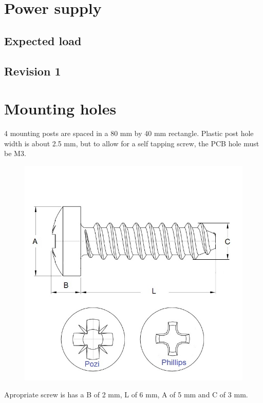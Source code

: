\documentclass[11pt]{article}
\begin{document}
\section{Power supply}

\subsection{Expected load}
\subsection{Revision 1}



\section{Mounting holes}
4 mounting posts are spaced in a 80 mm by 40 mm rectangle. Plastic post 
hole width is about 2.5 mm, but to allow for a self tapping screw, the PCB 
hole must be M3.

\begin{figure}[H]
  \centering 
  \includegraphics[scale=0.4]{"./figs/screw_sizez.jpg"}
\end{figure}

Apropriate screw is has a B of 2 mm, L of 6 mm, A of 5 mm and C of 3 mm. 
\end{document}
